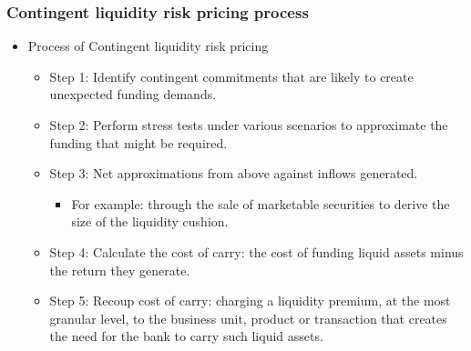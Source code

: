 \subsubsection{Contingent liquidity risk pricing process}
\begin{itemize}
\item Process of Contingent liquidity risk pricing
    \begin{itemize}
    \item Step 1: Identify contingent commitments that are likely to create unexpected funding demands.
    \item Step 2: Perform stress tests under various scenarios to approximate the funding that might be required.
    \item Step 3: Net approximations from above against inflows generated.
        \begin{itemize}
        \item For example: through the sale of marketable securities to derive the size of the liquidity cushion.
        \end{itemize}
    \item Step 4: Calculate the cost of carry: the cost of funding liquid assets minus the return they generate.
    \item Step 5: Recoup cost of carry: charging a liquidity premium, at the most granular level, to the business unit, product or transaction that creates the need for the bank to carry such liquid assets.
    \end{itemize}
    
\end{itemize}


